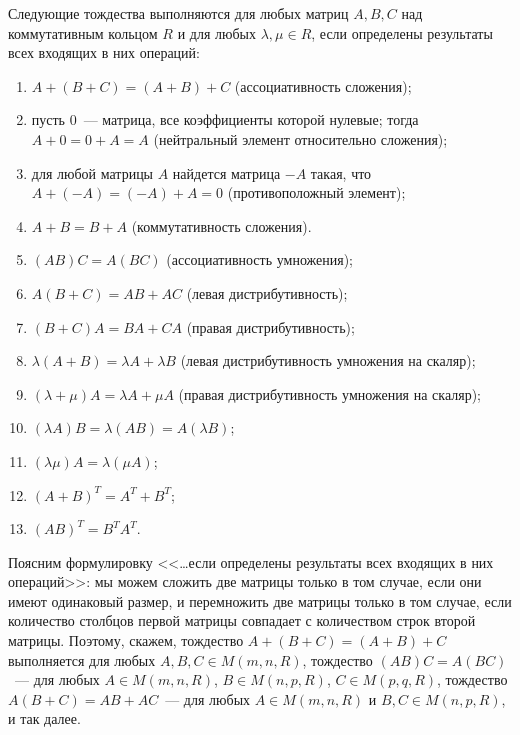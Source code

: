 \begin{theorem}\label{thm_matrix_operations_properties}
Следующие тождества выполняются для любых матриц $A,B,C$ над коммутативным
кольцом $R$ и для любых $\lambda,\mu\in R$,
если определены результаты всех входящих в них операций:
\begin{enumerate}
\item $A+(B+C)=(A+B)+C$ (ассоциативность сложения);
\item пусть $0$~--- матрица, все коэффициенты которой нулевые; тогда
  $A+0=0+A=A$ (нейтральный элемент относительно сложения);
\item для любой матрицы $A$ найдется матрица $-A$ такая, что
  $A+(-A)=(-A)+A=0$ (противоположный элемент);
\item $A+B=B+A$ (коммутативность сложения).
\item $(AB)C=A(BC)$ (ассоциативность умножения);
\item $A(B+C)=AB+AC$ (левая дистрибутивность);
\item $(B+C)A=BA+CA$ (правая дистрибутивность);
\item $\lambda(A+B)=\lambda A+\lambda B$ (левая дистрибутивность умножения
  на скаляр);
\item $(\lambda+\mu)A=\lambda A + \mu A$ (правая дистрибутивность
  умножения на скаляр);
\item $(\lambda A)B=\lambda (AB)=A(\lambda B)$;
\item $(\lambda\mu)A=\lambda(\mu A)$;
\item $(A+B)^T=A^T+B^T$;
\item\label{property_mult_transpose} $(AB)^T=B^TA^T$.
\end{enumerate}
\end{theorem}
Поясним формулировку <<\dots если определены результаты всех входящих
в них операций>>: мы можем сложить две матрицы только в том случае,
если они имеют одинаковый размер, и перемножить две матрицы только в
том случае, если количество столбцов первой матрицы совпадает с
количеством строк второй матрицы. Поэтому, скажем, тождество
$A+(B+C)=(A+B)+C$ выполняется для любых $A,B,C\in M(m,n,R)$, тождество
$(AB)C=A(BC)$~--- для любых $A\in M(m,n,R)$, $B\in M(n,p,R)$, $C\in
M(p,q,R)$, тождество $A(B+C)=AB+AC$~--- для любых $A\in M(m,n,R)$ и
$B,C\in M(n,p,R)$, и так далее.

